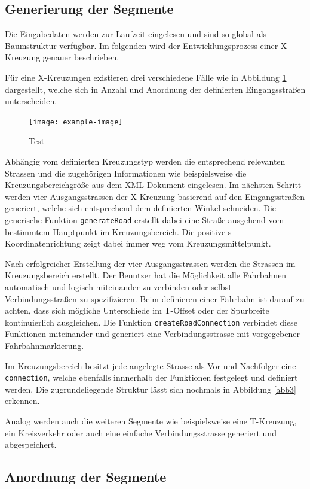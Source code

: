 \subsection{Generierung der Segmente}
Die Eingabedaten werden zur Laufzeit eingelesen und sind so global als Baumstruktur verfügbar. Im folgenden wird der Entwicklungsprozess einer X-Kreuzung genauer beschrieben. 

Für eine X-Kreuzungen existieren drei verschiedene Fälle wie in Abbildung \ref{abb4} dargestellt, welche sich in Anzahl und Anordnung der definierten Eingangsstraßen unterscheiden.

\begin{figure}[H]
	\flushleft
	\texttt{[image: example-image]}
	\caption{Test}
	\label{abb4}
\end{figure}

Abhängig vom definierten Kreuzungstyp werden die entsprechend relevanten Strassen und die zugehörigen Informationen wie beispielsweise die Kreuzungsbereichgröße aus dem XML Dokument eingelesen. Im nächsten Schritt werden vier Ausgangsstrassen der X-Kreuzung basierend auf den Eingangsstraßen generiert, welche sich entsprechend dem definierten Winkel schneiden. Die generische Funktion \texttt{generateRoad} erstellt dabei eine Straße ausgehend vom bestimmtem Hauptpunkt im Kreuzungsbereich. Die positive s Koordinatenrichtung zeigt dabei immer weg vom Kreuzungsmittelpunkt. 

Nach erfolgreicher Erstellung der vier Ausgangsstrassen werden die Strassen im Kreuzungsbereich erstellt. Der Benutzer hat die Möglichkeit alle Fahrbahnen automatisch und logisch miteinander zu verbinden oder selbst Verbindungsstraßen zu spezifizieren. Beim definieren einer Fahrbahn ist darauf zu achten, dass sich mögliche Unterschiede im T-Offset oder der Spurbreite kontinuierlich ausgleichen. Die Funktion \texttt{createRoadConnection} verbindet diese Funktionen miteinander und generiert eine Verbindungsstrasse mit vorgegebener Fahrbahnmarkierung. 

Im Kreuzungsbereich besitzt jede angelegte Strasse als Vor und Nachfolger eine \texttt{connection}, welche ebenfalls innnerhalb der Funktionen festgelegt und definiert werden. Die zugrundeliegende Struktur lässt sich nochmals in Abbildung \ref{abb3} erkennen.

Analog werden auch die weiteren Segmente wie beispielsweise eine T-Kreuzung, ein Kreisverkehr oder auch eine einfache Verbindungsstrasse generiert und abgespeichert.

\subsection{Anordnung der Segmente}

